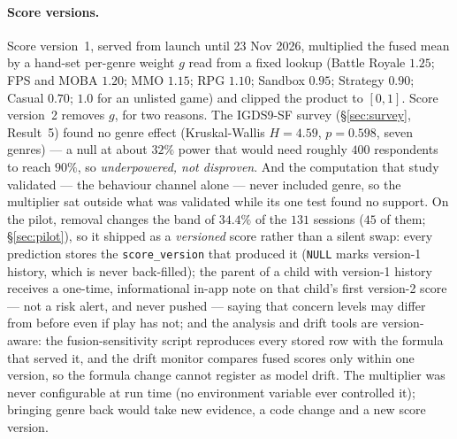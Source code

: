 \documentclass[11pt,a4paper]{article}
\begin{document}
\paragraph{Score versions.}
\label{sec:scoreversion}
Score version~1, served from launch until 23 Nov 2026, multiplied the fused mean
by a hand-set per-genre weight $g$ read from a fixed lookup (Battle Royale $1.25$;
FPS and MOBA $1.20$; MMO $1.15$; RPG $1.10$; Sandbox $0.95$; Strategy $0.90$;
Casual $0.70$; $1.0$ for an unlisted game) and clipped the product to $[0,1]$.
Score version~2 removes $g$, for two reasons. The IGDS9-SF survey
(\S\ref{sec:survey}, Result~5) found no genre effect (Kruskal-Wallis $H = 4.59$,
$p = 0.598$, seven genres) --- a null at about $32\%$ power that would need
roughly $400$ respondents to reach $90\%$, so \emph{underpowered, not
disproven}. And the computation that study validated --- the behaviour channel
alone --- never included genre, so the multiplier sat outside what was validated
while its one test found no support. On the pilot, removal changes the band of
$34.4\%$ of the $131$ sessions ($45$ of them; \S\ref{sec:pilot}), so it shipped
as a \emph{versioned} score rather than a silent swap: every prediction stores
the \texttt{score\_version} that produced it (\texttt{NULL} marks version-1
history, which is never back-filled); the parent of a child with version-1
history receives a one-time, informational in-app note on that child's first
version-2 score --- not a risk alert, and never pushed --- saying that concern
levels may differ from before even if play has not; and the analysis and drift
tools are version-aware: the fusion-sensitivity script reproduces every stored
row with the formula that served it, and the drift monitor compares fused scores
only within one version, so the formula change cannot register as model drift.
The multiplier was never configurable at run time (no environment variable ever
controlled it); bringing genre back would take new evidence, a code change and a
new score version.
\end{document}
